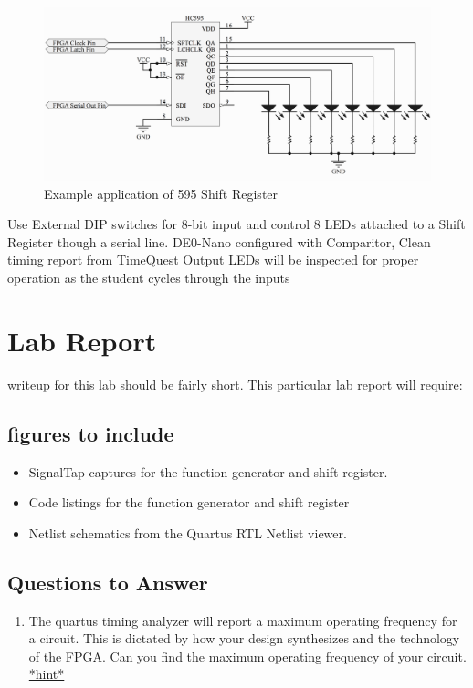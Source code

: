    \begin{figure}[H]
      \includegraphics[width=.48\textwidth]{Schematics/ShiftRegister.png}
      \caption{Example application of 595 Shift Register}
      \label{SR}
    \end{figure}

      {Use External DIP switches for 8-bit input and control 8 LEDs attached to a Shift Register though a serial line.}
      {DE0-Nano configured with Comparitor, Clean timing report from TimeQuest}
      {Output LEDs will be inspected for proper operation as the student cycles through the inputs}

\section{\bfseries  Lab Report}
     writeup for this lab should be fairly short. This particular lab report will require:
    \subsection{figures to include}
    \begin{itemize}
      \item SignalTap captures for the function generator and shift register.
      \item Code listings for the function generator and shift register
      \item Netlist schematics from the Quartus RTL Netlist viewer.
    \end{itemize}

    \subsection{Questions to Answer}
      \begin{enumerate}
        \item The quartus timing analyzer will report a maximum operating frequency for a circuit. This is dictated by how your design synthesizes and the technology of the FPGA. Can you find the maximum operating frequency of your circuit. \href{http://quartushelp.altera.com/12.1/mergedProjects/analyze/sta/sta_com_report_fmax.htm}{*hint*}
      \end{enumerate}

